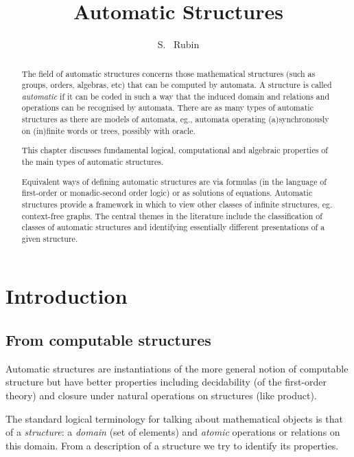 \documentclass{book}
\title{Automatic Structures}{Automatic Structures}
\author{S. ~Rubin}{Sasha Rubin}
\newif\iffilled
\begin{document}
\maketitle

\begin{abstract}
The field of automatic structures concerns those mathematical structures (such
as groups, orders, algebras, etc) that can be computed by automata. A structure
is called {\em automatic} if it can be coded in such a way that the induced
domain and relations and operations can be recognised by automata.  There are
as many types of automatic structures as there are models of automata, eg.,
automata operating (a)synchronously on (in)finite words or trees, possibly with
oracle.

This chapter discusses fundamental logical, computational and algebraic
properties of the main types of automatic structures. 

Equivalent ways of defining automatic structures are via formulas (in the
language of first-order or monadic-second order logic) or as solutions of
equations.  Automatic structures provide a framework in which to view other
classes of infinite structures, eg. context-free graphs. The central themes in
the literature include the classification of classes of automatic structures
and identifying essentially different presentations of a given structure.


\end{abstract}

\tableofcontents

\section{Introduction}


\subsection{From computable structures}
Automatic structures are instantiations of the more general notion of
computable structure but have better properties including decidability (of the
first-order theory) and closure under natural operations on structures (like
product).
 
\iffilled The standard logical terminology for talking about mathematical
objects is that of a {\em structure}: a {\em domain} (set of elements) and {\em
atomic} operations or relations on this domain.  From a description of a
structure we try to identify its properties.
\end{document}
